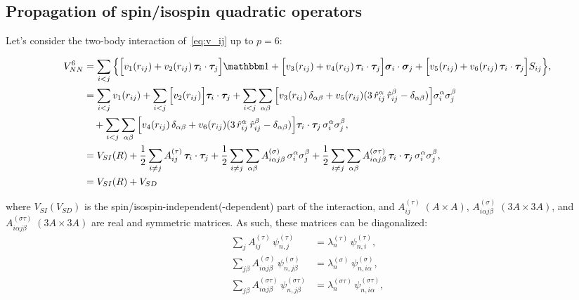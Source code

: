 \documentclass[aps,prc,twocolumn,superscriptaddress,floatfix]{revtex4-1}
\begin{document}
\subsection{Propagation of spin/isospin quadratic operators}
\label{sec:p2}
Let's consider the two-body interaction of~\cref{eq:v_ij} up to $p=6$:
\begin{widetext}
\begin{align}
V_{NN}^6&=\sum_{i<j}\Big\{	
 \Big[v_1(r_{ij})+v_2(r_{ij})\,\bm\tau_i\cdot\bm\tau_j\Big]\mathbbm1
+\Big[v_3(r_{ij})+v_4(r_{ij})\,\bm\tau_i\cdot\bm\tau_j\Big]\bm\sigma_i\cdot\bm\sigma_j
+\Big[v_5(r_{ij})+v_6(r_{ij})\,\bm\tau_i\cdot\bm\tau_j\Big]S_{ij}\Big\} , \nonumber \\
&=\sum_{i<j}v_1(r_{ij})+\sum_{i<j}\Big[v_2(r_{ij})\Big]\bm\tau_i\cdot\bm\tau_j
+\sum_{i<j}\sum_{\alpha\beta}\Big[v_3(r_{ij})\,\delta_{\alpha\beta}
+v_5(r_{ij})(3\,\hat{r}_{ij}^\alpha\,\hat{r}_{ij}^\beta-\delta_{\alpha\beta})\Big]\sigma_i^\alpha\sigma_j^\beta \nonumber \\ 
&\quad+\sum_{i<j}\sum_{\alpha\beta}\Big[v_4(r_{ij})\,\delta_{\alpha\beta}
+v_6(r_{ij})(3\,\hat{r}_{ij}^\alpha\,\hat{r}_{ij}^\beta-\delta_{\alpha\beta})\Big]\bm\tau_i\cdot\bm\tau_j\,\sigma_i^\alpha\sigma_j^\beta , \nonumber \\
&=V_{SI}(R)+{1\over2}\sum_{i\ne j}A^{(\tau)}_{ij}\,\bm\tau_i\cdot\bm\tau_j
+{1\over2}\sum_{i\ne j}\sum_{\alpha\beta}A^{(\sigma)}_{i\alpha j\beta}\,\sigma_i^{\alpha}\sigma_j^{\beta}
+{1\over2}\sum_{i\ne j}\sum_{\alpha\beta}A^{(\sigma\tau)}_{i\alpha j\beta} \,\bm\tau_i\cdot\bm\tau_j\,\sigma_i^{\alpha}\sigma_j^{\beta} , \nonumber \\
&=V_{SI}(R)+V_{SD} \, \label{eq:v_si+sd}
\end{align}
\end{widetext}
where $V_{SI}(V_{SD})$ is the spin/isospin-independent(-dependent) part of the interaction, 
and $A^{(\tau)}_{ij}\;(A\times A)$, $A^{(\sigma)}_{i\alpha j\beta}\;(3A\times 3A)$, 
and $A^{(\sigma\tau)}_{i\alpha j\beta}\;(3A\times 3A)$
are real and symmetric matrices.
As such, these matrices can be diagonalized:
\begin{align}
\sum_{j}A^{(\tau)}_{ij}\,\psi_{n,j}^{(\tau)}&=\lambda_n^{(\tau)}\,\psi_{n,i}^{(\tau)} , \nonumber \\
\sum_{j\beta}A^{(\sigma)}_{i\alpha j\beta}\,\psi_{n,j\beta}^{(\sigma)}&=\lambda_n^{(\sigma)}\,\psi_{n,i\alpha}^{(\sigma)} , \nonumber \\
\sum_{j\beta}A^{(\sigma\tau)}_{i\alpha j\beta}\,\psi_{n,j\beta}^{(\sigma\tau)}&=\lambda_n^{(\sigma\tau)}\,\psi_{n,i\alpha}^{(\sigma\tau)} ,
\end{align}
\end{document}

